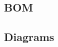 \documentclass[../jb_user_manual.tex]{subfiles}
\begin{document}
\subsection{BOM}
\subsection{Diagrams}
\end{document}
